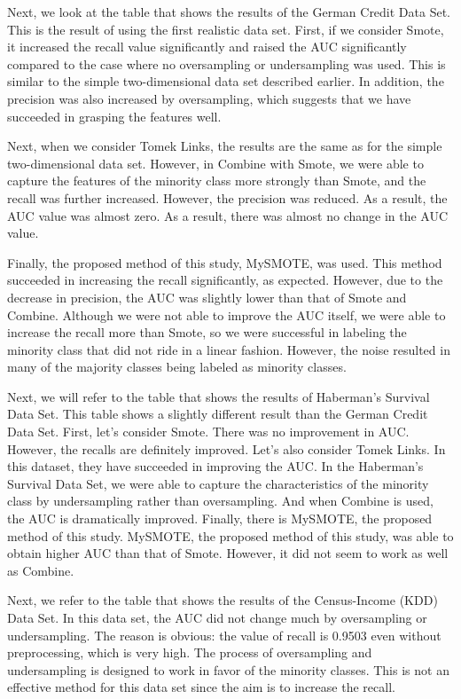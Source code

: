 Next, we look at the table that shows the results of the German Credit Data Set. This is the result of using the first realistic data set. First, if we consider Smote, it increased the recall value significantly and raised the AUC significantly compared to the case where no oversampling or undersampling was used. This is similar to the simple two-dimensional data set described earlier. In addition, the precision was also increased by oversampling, which suggests that we have succeeded in grasping the features well. 

Next, when we consider Tomek Links, the results are the same as for the simple two-dimensional data set. However, in Combine with Smote, we were able to capture the features of the minority class more strongly than Smote, and the recall was further increased. However, the precision was reduced. As a result, the AUC value was almost zero. As a result, there was almost no change in the AUC value. 

Finally, the proposed method of this study, MySMOTE, was used. This method succeeded in increasing the recall significantly, as expected. However, due to the decrease in precision, the AUC was slightly lower than that of Smote and Combine. Although we were not able to improve the AUC itself, we were able to increase the recall more than Smote, so we were successful in labeling the minority class that did not ride in a linear fashion. However, the noise resulted in many of the majority classes being labeled as minority classes.

Next, we will refer to the table that shows the results of Haberman's Survival Data Set.
This table shows a slightly different result than the German Credit Data Set. First, let's consider Smote. There was no improvement in AUC. However, the recalls are definitely improved. Let's also consider Tomek Links. In this dataset, they have succeeded in improving the AUC. In the Haberman's Survival Data Set, we were able to capture the characteristics of the minority class by undersampling rather than oversampling. And when Combine is used, the AUC is dramatically improved.
Finally, there is MySMOTE, the proposed method of this study. MySMOTE, the proposed method of this study, was able to obtain higher AUC than that of Smote. However, it did not seem to work as well as Combine.

Next, we refer to the table that shows the results of the Census-Income (KDD) Data Set.
In this data set, the AUC did not change much by oversampling or undersampling. The reason is obvious: the value of recall is 0.9503 even without preprocessing, which is very high. The process of oversampling and undersampling is designed to work in favor of the minority classes. This is not an effective method for this data set since the aim is to increase the recall. 

